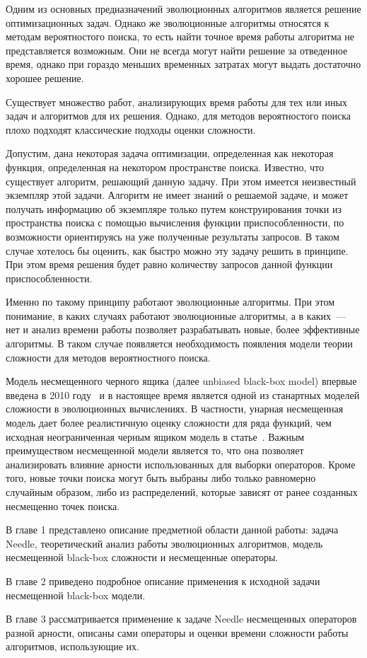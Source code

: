 \startprefacepage

Одним из основных предназначений эволюционных алгоритмов является решение оптимизационных задач. 
Однако же эволюционные алгоритмы относятся к методам вероятностого поиска, то есть найти точное время работы алгоритма не представляется возможным. 
Они не всегда могут найти решение за отведенное время, однако при гораздо меньших временных затратах могут выдать достаточно хорошее решение. 

Существует множество работ, анализирующих время работы для тех или иных задач и алгоритмов для их решения. Однако, для методов вероятностого поиска плохо подходят классические подходы оценки сложности. 

Допустим, дана некоторая задача оптимизации, определенная как некоторая функция, определенная на некотором пространстве поиска. Известно, что существует алгоритм, решающий данную задачу. 
При этом имеется неизвестный экземпляр этой задачи. Алгоритм не имеет знаний о решаемой задаче, и может получать информацию об экземпляре только путем конструирования точки из пространства 
поиска с помощью вычисления функции приспособленности, по возможности ориентируясь на уже полученные результаты запросов. 
В таком случае хотелось бы оценить, как быстро можно эту задачу решить в принципе. При этом время решения будет равно количеству запросов данной функции приспособленности.

Именно по такому принципу работают эволюционные алгоритмы. При этом понимание, в каких случаях работают эволюционные алгоритмы, а в каких~--- нет и анализ времени работы позволяет разрабатывать новые, 
более эффективные алгоритмы. В таком случае появляется необходимость появления модели теории сложности для методов вероятностного поиска. 

Модель несмещенного черного ящика (далее unbiased black-box model) впервые введена в 2010 году~\cite{1} и в настоящее время является одной из станартных моделей сложности в эволюционных вычислениях. 
В частности, унарная несмещенная модель дает более реалистичную оценку сложности для ряда функций, чем исходная неограниченная черным ящиком модель в статье~\cite{2}.   
Важным преимуществом несмещенной модели является то, что она позволяет анализировать влияние арности использованных для выборки операторов. Кроме того, новые точки поиска могут быть выбраны
либо только равномерно случайным образом, либо из распределений, которые зависят от ранее созданных несмещенно точек поиска. 

В главе 1 представлено описание предметной области данной работы: задача Needle, теоретический анализ работы эволюционных алгоритмов, модель несмещенной black-box сложности и несмещенные операторы. 

В главе 2 приведено подробное описание применения к исходной задачи несмещенной black-box модели.

В главе 3 рассматривается применение к задаче Needle несмещенных операторов разной арности, описаны сами операторы и оценки времени сложности работы алгоритмов, использующие их. 
